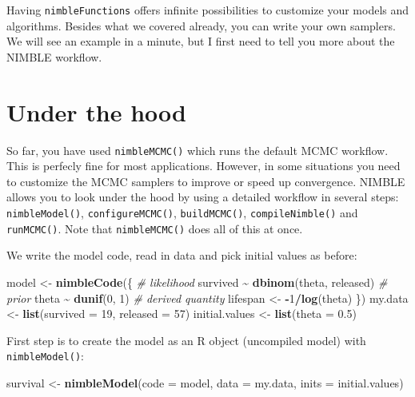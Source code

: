 \documentclass[
  12pt,
]{krantz}
\newenvironment{Shaded}{\begin{snugshade}}{\end{snugshade}}
\newcommand{\AttributeTok}[1]{\textcolor[rgb]{0.13,0.29,0.53}{#1}}
\newcommand{\CommentTok}[1]{\textcolor[rgb]{0.56,0.35,0.01}{\textit{#1}}}
\newcommand{\DecValTok}[1]{\textcolor[rgb]{0.00,0.00,0.81}{#1}}
\newcommand{\FloatTok}[1]{\textcolor[rgb]{0.00,0.00,0.81}{#1}}
\newcommand{\FunctionTok}[1]{\textcolor[rgb]{0.13,0.29,0.53}{\textbf{#1}}}
\newcommand{\NormalTok}[1]{#1}
\newcommand{\OtherTok}[1]{\textcolor[rgb]{0.56,0.35,0.01}{#1}}
\newcommand{\SpecialCharTok}[1]{\textcolor[rgb]{0.81,0.36,0.00}{\textbf{#1}}}
\begin{document}
Having \texttt{nimbleFunctions} offers infinite possibilities to customize your models and algorithms. Besides what we covered already, you can write your own samplers. We will see an example in a minute, but I first need to tell you more about the NIMBLE workflow.

\section{Under the hood}\label{under-the-hood}

So far, you have used \texttt{nimbleMCMC()} which runs the default MCMC workflow. This is perfecly fine for most applications. However, in some situations you need to customize the MCMC samplers to improve or speed up convergence. NIMBLE allows you to look under the hood by using a detailed workflow in several steps: \texttt{nimbleModel()}, \texttt{configureMCMC()}, \texttt{buildMCMC()}, \texttt{compileNimble()} and \texttt{runMCMC()}. Note that \texttt{nimbleMCMC()} does all of this at once.

We write the model code, read in data and pick initial values as before:

\begin{Shaded}
\begin{Highlighting}[]
\NormalTok{model }\OtherTok{\textless{}{-}} \FunctionTok{nimbleCode}\NormalTok{(\{}
  \CommentTok{\# likelihood}
\NormalTok{  survived }\SpecialCharTok{\textasciitilde{}} \FunctionTok{dbinom}\NormalTok{(theta, released)}
  \CommentTok{\# prior}
\NormalTok{  theta }\SpecialCharTok{\textasciitilde{}} \FunctionTok{dunif}\NormalTok{(}\DecValTok{0}\NormalTok{, }\DecValTok{1}\NormalTok{)}
  \CommentTok{\# derived quantity}
\NormalTok{  lifespan }\OtherTok{\textless{}{-}} \SpecialCharTok{{-}}\DecValTok{1}\SpecialCharTok{/}\FunctionTok{log}\NormalTok{(theta)}
\NormalTok{\})}
\NormalTok{my.data }\OtherTok{\textless{}{-}} \FunctionTok{list}\NormalTok{(}\AttributeTok{survived =} \DecValTok{19}\NormalTok{, }\AttributeTok{released =} \DecValTok{57}\NormalTok{)}
\NormalTok{initial.values }\OtherTok{\textless{}{-}} \FunctionTok{list}\NormalTok{(}\AttributeTok{theta =} \FloatTok{0.5}\NormalTok{)}
\end{Highlighting}
\end{Shaded}

First step is to create the model as an R object (uncompiled model) with \texttt{nimbleModel()}:

\begin{Shaded}
\begin{Highlighting}[]
\NormalTok{survival }\OtherTok{\textless{}{-}} \FunctionTok{nimbleModel}\NormalTok{(}\AttributeTok{code =}\NormalTok{ model,}
                        \AttributeTok{data =}\NormalTok{ my.data,}
                        \AttributeTok{inits =}\NormalTok{ initial.values)}
\end{Highlighting}
\end{Shaded}
\end{document}
